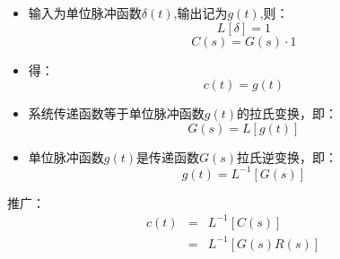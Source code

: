  \begin{frame}
 \begin{block}{}
 \begin{itemize}
 \item<+-> 输入为单位脉冲函数$\delta(t)$,输出记为$g(t)$,则：
 \[L[\delta]=1\]
 \[C(s)=G(s)\cdot 1\]
 \item<+-> 得：
 \[c(t)=g(t)\]
\end{itemize}  
\end{block}
\end{frame}

\begin{frame}
\begin{block}{}
\begin{itemize}
\item<+-> 系统传递函数等于单位脉冲函数$g(t)$的拉氏变换，即：
\[G(s)=L[g(t)]\]
\item<+-> 单位脉冲函数$g(t)$是传递函数$G(s)$拉氏逆变换，即：
\[g(t)=L^{-1}[G(s)]\]
\end{itemize}
\end{block}
\end{frame}
\begin{frame}
\begin{block}{}
推广：
\begin{eqnarray*}
c(t)&=&L^{-1}[C(s)]\\
&=&L^{-1}[G(s)R(s)]
\end{eqnarray*}

\end{block}
\end{frame}
